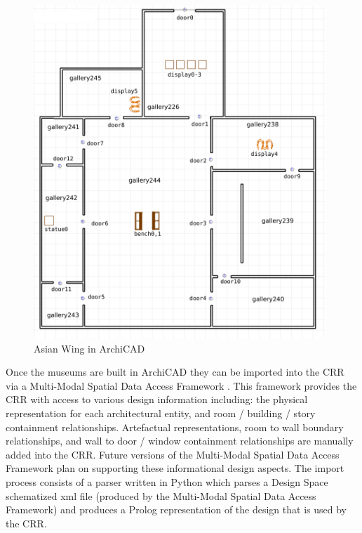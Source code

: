 \documentclass[12pt]{ucthesis}
\begin{document}
\begin{figure}[h]
\centering
\includegraphics[width=110mm]{museum-floor-plan-reqs3}
\caption{Asian Wing in ArchiCAD}
\label{art museum in archiCAD}
\end{figure}


Once the museums are built in ArchiCAD they can be imported into the CRR via a Multi-Modal Spatial Data Access Framework \cite{carl}. This framework provides the CRR with access to various design information including: the physical representation for each architectural entity, and room / building / story containment relationships. Artefactual representations, room to wall boundary relationships, and wall to door / window containment relationships are manually added into the CRR. Future versions of the Multi-Modal Spatial Data Access Framework plan on supporting these informational design aspects. The import process consists of a parser written in Python which parses a Design Space schematized xml file (produced by the Multi-Modal Spatial Data Access Framework) and produces a Prolog representation of the design that is used by the CRR.

\end{document}

